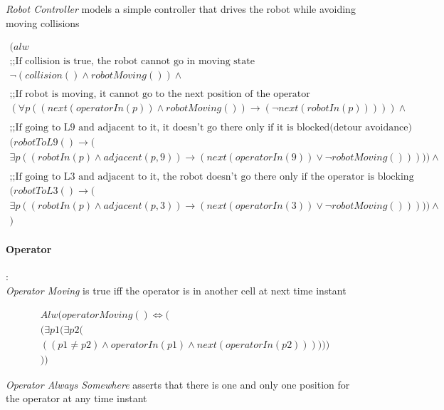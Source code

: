 \textit{Robot Controller} models a simple controller that drives the robot while avoiding moving collisions

\begin{align*}
	(alw\\
	\text{;;If collision is true, the robot cannot go in moving state}\\
	\neg(collision()\land robotMoving())\land \\
	\\
	\text{;;If robot is moving, it cannot go to the next position of the operator}\\
	(\forall p((next(operatorIn(p))\land robotMoving())\longrightarrow(\neg next(robotIn(p)))))\land\\
	\\
	\text{;;If going to L9 and adjacent to it, it doesn't go there only if it is blocked(detour avoidance)}\\
	(robotToL9()\longrightarrow(\\
	\exists p((robotIn(p)\land adjacent(p,9))\longrightarrow(next(operatorIn(9))\lor \neg robotMoving()))))\land\\
	\\
	\text{;;If going to L3 and adjacent to it, the robot doesn't go there only if the operator is blocking}\\
	(robotToL3()\longrightarrow(\\
	\exists p((robotIn(p)\land adjacent(p,3))\longrightarrow(next(operatorIn(3))\lor \neg robotMoving()))))\land\\
	)
\end{align*}


\paragraph{Operator}:\\

\textit{Operator Moving} is true iff the operator is in another cell at next time instant

\begin{align*}
	Alw(operatorMoving()\iff (\\
	(\exists p1(\exists p2 (\\
	((p1\neq p2)\land operatorIn(p1) \land next(operatorIn(p2))) )))\\
	))
\end{align*}

\textit{Operator Always Somewhere} asserts that there is one and only one position for the operator at any time instant

